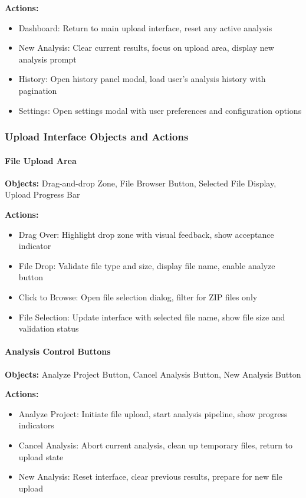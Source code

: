 \documentclass[12pt,a4paper]{article}
\begin{document}
    \textbf{Actions:}
    \begin{itemize}[leftmargin=0.5in]
        \item Dashboard: Return to main upload interface, reset any active analysis
        \item New Analysis: Clear current results, focus on upload area, display new analysis prompt
        \item History: Open history panel modal, load user's analysis history with pagination
        \item Settings: Open settings modal with user preferences and configuration options
    \end{itemize}

    \subsubsection{Upload Interface Objects and Actions}

    \paragraph{File Upload Area}
    \textbf{Objects:} Drag-and-drop Zone, File Browser Button, Selected File Display, Upload Progress Bar

    \textbf{Actions:}
    \begin{itemize}[leftmargin=0.5in]
        \item Drag Over: Highlight drop zone with visual feedback, show acceptance indicator
        \item File Drop: Validate file type and size, display file name, enable analyze button
        \item Click to Browse: Open file selection dialog, filter for ZIP files only
        \item File Selection: Update interface with selected file name, show file size and validation status
    \end{itemize}

    \paragraph{Analysis Control Buttons}
    \textbf{Objects:} Analyze Project Button, Cancel Analysis Button, New Analysis Button

    \textbf{Actions:}
    \begin{itemize}[leftmargin=0.5in]
        \item Analyze Project: Initiate file upload, start analysis pipeline, show progress indicators
        \item Cancel Analysis: Abort current analysis, clean up temporary files, return to upload state
        \item New Analysis: Reset interface, clear previous results, prepare for new file upload
    \end{itemize}
\end{document}
